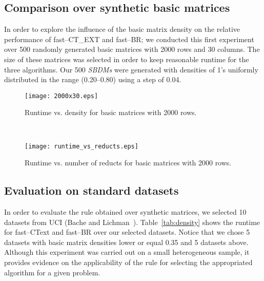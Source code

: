 \documentclass[citeauthoryear]{llncs}
\begin{document}
%
\subsection{Comparison over synthetic basic matrices}
%
In order to explore the influence of the basic matrix density on the relative performance of fast--CT\_EXT and fast--BR; we conducted this first experiment over 500 randomly generated basic matrices with 2000 rows and 30 columns. The size of these matrices was selected in order to keep reasonable runtime for the three algorithms. Our 500 \textit{SBDMs} were generated with densities of 1's uniformly distributed in the range (0.20--0.80) using a step of 0.04. 

	\begin{figure}[htb]
	    \centering
	    \begin{minipage}{.48\textwidth}
	        \centering
	        \texttt{[image: 2000x30.eps]}
	        \label{fig:density}
	        \caption{Runtime vs. density for basic matrices with 2000 rows.}
	    \end{minipage}%
	    {~~}
	    \begin{minipage}{0.48\textwidth}
	        \centering
	        \texttt{[image: runtime\_vs\_reducts.eps]}
	        \label{fig:reducts}
	        \caption{Runtime vs. number of reducts for basic matrices with 2000 rows.}	        
	    \end{minipage}
	\end{figure}
%
\subsection{Evaluation on standard datasets}
%
	In order to evaluate the rule obtained over synthetic matrices, we selected 10 datasets from UCI (Bache and Lichman~\cite{Bache13}). Table~\ref{tab:density} shows the runtime for fast--CText and fast--BR over our selected datasets. Notice that we chose 5 datasets with basic matrix densities lower or equal 0.35 and 5 datasets above. Although this experiment was carried out on a small heterogeneous sample, it provides evidence on the applicability of the rule for selecting the appropriated algorithm for a given problem.
	
\end{document}
